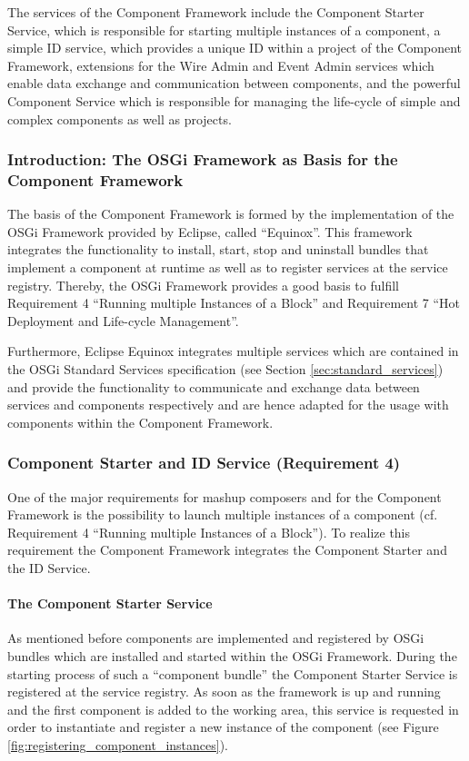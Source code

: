 The services of the Component Framework include the Component Starter Service, which is responsible
for starting multiple instances of a component, a simple ID service, which provides a unique ID
within a project of the Component Framework, extensions for the Wire Admin and Event Admin services
which enable data exchange and communication between components, and the powerful Component Service
which is responsible for managing the life-cycle of simple and complex components as well as
projects.

\subsubsection{Introduction: The OSGi Framework as Basis for the Component Framework}
The basis of the Component Framework is formed by the implementation of the OSGi Framework provided
by Eclipse, called ``Equinox''. This framework integrates the functionality to install, start, stop
and uninstall bundles that implement a component at runtime as well as to register services at the
service registry. Thereby, the OSGi Framework provides a good basis to fulfill Requirement 4
``Running multiple Instances of a Block'' and Requirement 7 ``Hot Deployment and Life-cycle
Management''.

Furthermore, Eclipse Equinox integrates multiple services which are contained in the OSGi Standard
Services specification (see Section \ref{sec:standard_services}) and provide the functionality to
communicate and exchange data between services and components respectively and are hence adapted for
the usage with components within the Component Framework.

\subsubsection{Component Starter and ID Service (Requirement 4)}
\label{sec:component_starter_service}
One of the major requirements for mashup composers and for the Component Framework is the possibility
to launch multiple instances of a component (cf. Requirement 4 ``Running multiple Instances of a
Block''). To realize this requirement the Component Framework integrates the Component Starter and
the ID Service.

\paragraph{The Component Starter Service}
As mentioned before components are implemented and registered by OSGi bundles which are installed
and started within the OSGi Framework. During the starting process of such a ``component bundle''
the Component Starter Service is registered at the service registry. As soon as the framework is up
and running and the first component is added to the working area, this service is requested in
order to instantiate and register a new instance of the component (see Figure
\ref{fig:registering_component_instances}).

